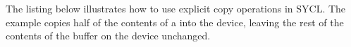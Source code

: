 \completeTable

The listing below illustrates how to use explicit copy 
operations in SYCL. The example copies half of the contents of 
a  into the device, leaving the rest of the 
contents of the buffer on the device unchanged.




